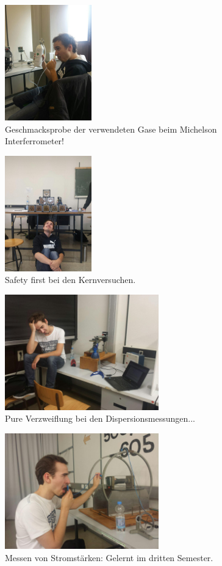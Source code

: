 \begin{figure}
  \centering
  \includegraphics[height=5cm]{extra/photo_2016-07-05_00-48-33.jpg}
  \caption{Geschmacksprobe der verwendeten Gase beim Michelson Interferrometer!}
\end{figure}

\begin{figure}
  \centering
  \includegraphics[height=5cm]{extra/photo_2016-07-05_00-49-08.jpg}
  \caption{Safety first bei den Kernversuchen.}
\end{figure}

\begin{figure}
  \centering
  \includegraphics[height=5cm]{extra/photo_2016-07-05_00-49-57.jpg}
  \caption{Pure Verzweiflung bei den Dispersionsmessungen...}
\end{figure}

\begin{figure}
  \centering
  \includegraphics[height=5cm]{extra/photo_2016-07-05_00-50-37.jpg}
  \caption{Messen von Stromstärken: Gelernt im dritten Semester.}
\end{figure}

